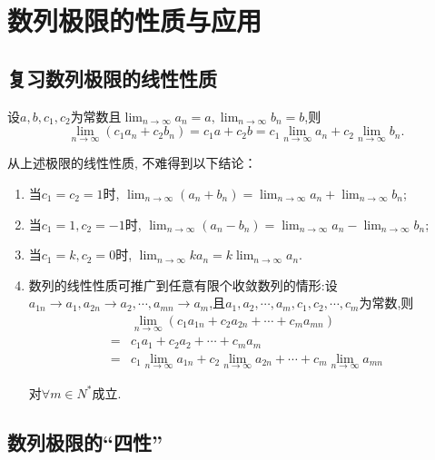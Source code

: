 \chapter{数列极限的性质与应用}

\section{复习数列极限的线性性质}

\begin{theorem}[数列极限的线性性质]\label{thm:sequence_limit_linear}
    设$a,b,c_1,c_2$为常数且$\lim_{n \to \infty} a_n = a, \lim_{n \to \infty} b_n=b$,则 $$\lim_{n \to \infty}(c_1 a_n+c_2b_n)=c_1a+c_2b =c_1 \lim_{n \to \infty} a_n+c_2 \lim_{n \to \infty} b_n . $$
    
\end{theorem}

从上述极限的线性性质, 不难得到以下结论：

\begin{enumerate}
    \item 当$c_1=c_2=1$时, $\lim_{n \to \infty} (a_n+b_n)=\lim_{n \to \infty} a_n+\lim_{n \to \infty} b_n$;
    \item 当$c_1=1,c_2=-1$时, $\lim_{n \to \infty} (a_n-b_n)=\lim_{n \to \infty} a_n-\lim_{n \to \infty} b_n$;
    \item 当$c_1=k,c_2=0$时, $\lim_{n \to \infty} ka_n=k\lim_{n \to \infty} a_n$.
    \item 数列的线性性质可推广到任意有限个收敛数列的情形:设$a_{1n} \rightarrow a_1, a_{2n} \rightarrow a_2, \cdots, a_{mn} \rightarrow a_m$,且$a_1,a_2,\cdots,a_m,c_1,c_2,\cdots,c_m$为常数,则
    \begin{align*}
    & \lim_{n \to \infty}(c_1a_{1n}+c_2a_{2n}+\cdots+c_ma_{mn}) \\
    =& c_1a_1+c_2a_2+\cdots+c_ma_m \\
    =&c_1\lim_{n \to \infty} a_{1n}+c_2\lim_{n \to \infty} a_{2n}+\cdots+c_m\lim_{n \to \infty} a_{mn}
    \end{align*}

    对$\forall m\in N^*$成立.
\end{enumerate}

\section{数列极限的“四性”}

